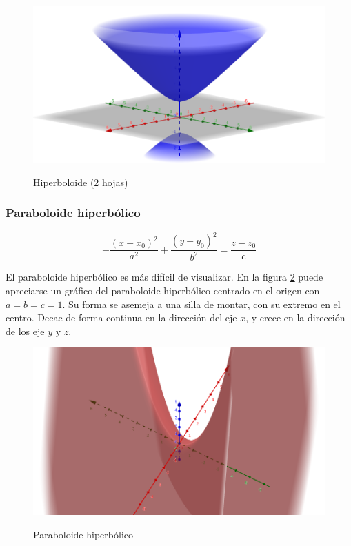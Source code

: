 \documentclass{article}
\begin{document}
\begin{figure}[ht]
\caption{Hiperboloide (2 hojas)}
\includegraphics[scale=0.5]{img/teo_fig005_hiperboloide2.png} 
\centering
\label{fig:hiperboloide2}
\end{figure}

\subsubsection{Paraboloide hiperbólico}

\begin{equation}
-\frac{(x-x_0)^2}{a^2} + \frac{(y-y_0)^2}{b^2} = \frac{z-z_0}{c}
\end{equation}

El paraboloide hiperbólico es más difícil de visualizar. En la figura \ref{fig:paraboloide_h} puede apreciarse un gráfico del paraboloide hiperbólico centrado en el origen con $a = b = c =1$. Su forma se asemeja a una silla de montar, con su extremo en el centro. Decae de forma continua en la dirección del eje $x$, y crece en la dirección de los eje $y$ y $z$.

\begin{figure}[ht]
\caption{Paraboloide hiperbólico}
\includegraphics[scale=0.3]{img/teo_fig006_paraboloideh.png} 
\centering
\label{fig:paraboloide_h}
\end{figure}
\end{document}
